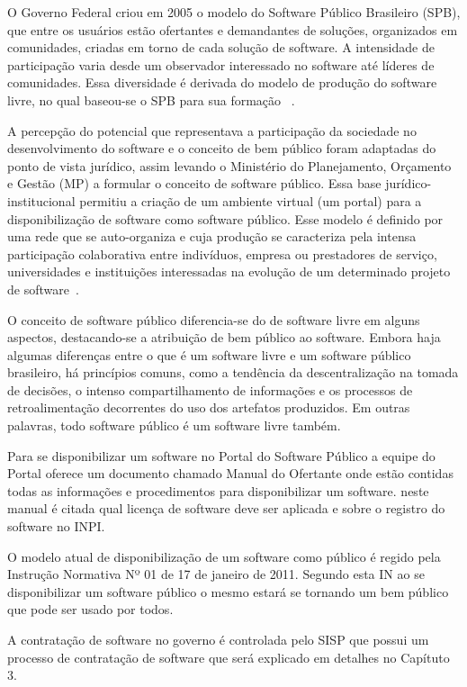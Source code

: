 O Governo Federal criou em 2005 o modelo do Software
Público Brasileiro (SPB), que entre os usuários estão ofertantes e demandantes de soluções, 
organizados em comunidades, criadas em torno de cada solução de software. A intensidade de participação
varia desde um observador interessado no software até líderes de comunidades. Essa diversidade é
derivada do modelo de produção do software livre, no qual baseou-se o SPB para sua formação
~\cite{alves2009software}. 

A percepção do potencial que representava a participação da sociedade no desenvolvimento do software
e o conceito de bem público foram adaptadas do ponto de vista jurídico, assim levando o Ministério
do Planejamento, Orçamento e Gestão (MP) a formular o conceito de software público. Essa base
jurídico-institucional permitiu a criação de um ambiente virtual (um portal) para a disponibilização
de software como software público. Esse modelo é definido por uma rede que se auto-organiza e cuja
produção se caracteriza pela intensa participação colaborativa entre indivíduos, empresa ou 
prestadores de serviço, universidades e instituições interessadas na evolução de um determinado projeto
de software~\cite{alves2009software}.

O conceito de software público diferencia-se do de software livre em alguns aspectos, destacando-se
a atribuição de bem público ao software. Embora haja algumas diferenças entre o que é um software
livre e um software público brasileiro, há princípios comuns, como a tendência da descentralização na
tomada de decisões, o intenso compartilhamento de informações e os processos de retroalimentação
decorrentes do uso dos artefatos produzidos. Em outras palavras, todo software público é um software
livre também.

Para se disponibilizar um software no Portal do Software Público a equipe do Portal 
oferece um documento chamado Manual do Ofertante onde estão contidas todas as 
informações e procedimentos para disponibilizar um software. neste manual é citada
qual licença de software deve ser aplicada e sobre o registro do software no INPI. 

O modelo atual de disponibilização de um software como público é
regido pela Instrução Normativa Nº 01 de 17 de janeiro de 2011. 
Segundo esta IN ao se disponibilizar um software público o mesmo estará se tornando um bem público
que pode ser usado por todos.

A contratação de software no governo é controlada pelo SISP que possui um processo de 
contratação de software que será explicado em detalhes no Capítuto 3.












